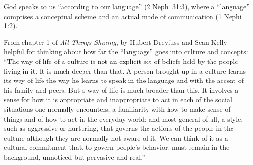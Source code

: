 		\begin{compactitem}
			\item God speaks to us ``according to our language'' (\hyperref[2NEPHI-31-3]{2 Nephi 31:3}), where a ``language'' comprises a conceptual scheme and an actual mode of communication (\hyperref[1NEPHI-1-2]{1 Nephi 1:2}).
				\begin{compactitem}
					\item From chapter 1 of \textit{All Things Shining}, by Hubert Dreyfuss and Sean Kelly---helpful for thinking about how far the ``language'' goes into culture and concepts: ``The way of life of a culture is not an explicit set of beliefs held by the people living in it. It is much deeper than that. A person brought up in a culture learns its way of life the way he learns to speak in the language and with the accent of his family and peers. But a way of life is much broader than this. It involves a sense for how it is appropriate and inappropriate to act in each of the social situations one normally encounters; a familiarity with how to make sense of things and of how to act in the everyday world; and most general of all, a style, such as aggressive or nurturing, that governs the actions of the people in the culture although they are normally not aware of it. We can think of it as a cultural commitment that, to govern people’s behavior, must remain in the background, unnoticed but pervasive and real.''
				\end{compactitem}
		\end{compactitem}